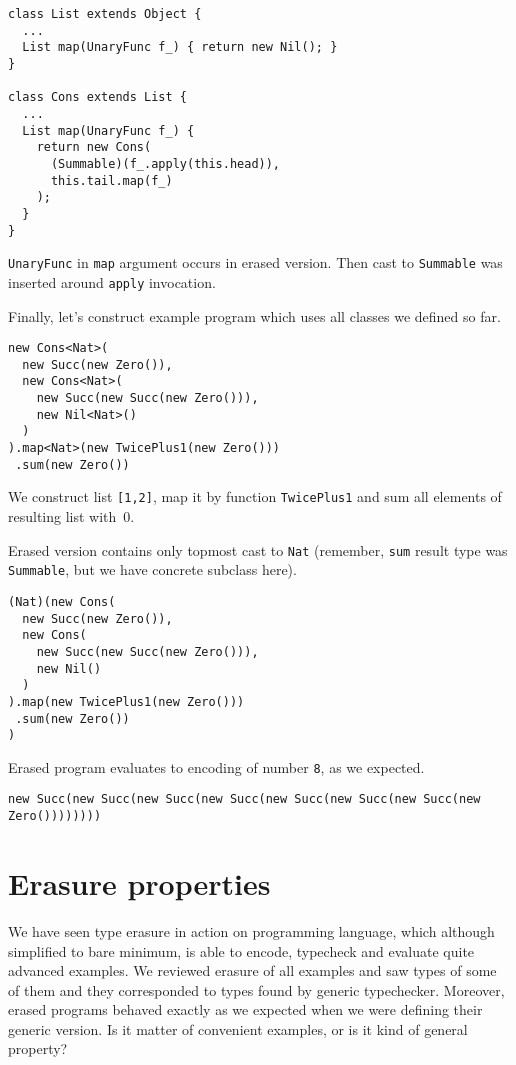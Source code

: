\documentclass{article}[12pt]
\begin{document}
\begin{verbatim}
class List extends Object {
  ...
  List map(UnaryFunc f_) { return new Nil(); }
}

class Cons extends List {
  ...
  List map(UnaryFunc f_) {
    return new Cons(
      (Summable)(f_.apply(this.head)),
      this.tail.map(f_)
    );     
  }
}
\end{verbatim}

\texttt{UnaryFunc} in \texttt{map} argument occurs in erased version. Then cast to \texttt{Summable} was inserted around \texttt{apply} invocation.

Finally, let's construct example program which uses all classes we defined so far.

\begin{verbatim}
new Cons<Nat>(
  new Succ(new Zero()),
  new Cons<Nat>(
    new Succ(new Succ(new Zero())),
    new Nil<Nat>()
  )
).map<Nat>(new TwicePlus1(new Zero()))
 .sum(new Zero())
\end{verbatim}

We construct list \texttt{[1,2]}, map it by function \texttt{TwicePlus1} and sum all elements of resulting list with~0.

Erased version contains only topmost cast to \texttt{Nat} (remember, \texttt{sum} result type was \texttt{Summable}, but we have concrete subclass here).

\begin{verbatim}
(Nat)(new Cons(
  new Succ(new Zero()),
  new Cons(
    new Succ(new Succ(new Zero())),
    new Nil()
  )
).map(new TwicePlus1(new Zero()))
 .sum(new Zero())
)
\end{verbatim}

Erased program evaluates to encoding of number \texttt{8}, as we expected.

\begin{verbatim}
new Succ(new Succ(new Succ(new Succ(new Succ(new Succ(new Succ(new Zero())))))))
\end{verbatim}


\section{Erasure properties}

We have seen type erasure in action on programming language, which although simplified to bare minimum, is able to encode, typecheck and evaluate quite advanced examples. We reviewed erasure of all examples and saw types of some of them and they corresponded to types found by generic typechecker. Moreover, erased programs behaved exactly as we expected when we were defining their generic version. Is it matter of convenient examples, or is it kind of general property?
\end{document}
